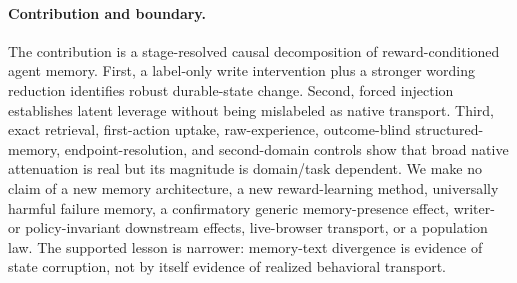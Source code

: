 \paragraph{Contribution and boundary.}
The contribution is a stage-resolved causal decomposition of reward-conditioned agent memory. First, a label-only write intervention plus a stronger wording reduction identifies robust durable-state change. Second, forced injection establishes latent leverage without being mislabeled as native transport. Third, exact retrieval, first-action uptake, raw-experience, outcome-blind structured-memory, endpoint-resolution, and second-domain controls show that broad native attenuation is real but its magnitude is domain/task dependent. We make no claim of a new memory architecture, a new reward-learning method, universally harmful failure memory, a confirmatory generic memory-presence effect, writer- or policy-invariant downstream effects, live-browser transport, or a population law. The supported lesson is narrower: memory-text divergence is evidence of state corruption, not by itself evidence of realized behavioral transport.
